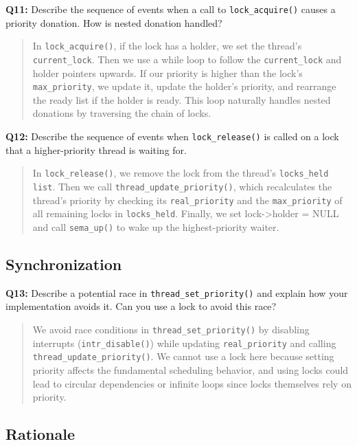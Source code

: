\documentclass[a4paper,11pt]{paper}
\begin{document}
\textbf{Q11:} Describe the sequence of events when a call to
\texttt{lock\_acquire()} causes a priority donation.  How is nested donation
handled?

\begin{quote}
  In \texttt{lock\_acquire()}, if the lock has a holder, we set the thread's \texttt{current\_lock}. Then we use a while loop to follow the \texttt{current\_lock} and holder pointers upwards. If our priority is higher than the lock's \texttt{max\_priority}, we update it, update the holder's priority, and rearrange the ready list if the holder is ready. This loop naturally handles nested donations by traversing the chain of locks.
\end{quote}

\textbf{Q12:} Describe the sequence of events when \texttt{lock\_release()} is
called on a lock that a higher-priority thread is waiting for.

\begin{quote}
  In \texttt{lock\_release()}, we remove the lock from the thread's \texttt{locks\_held list}. Then we call \texttt{thread\_update\_priority()}, which recalculates the thread's priority by checking its \texttt{real\_priority} and the \texttt{max\_priority} of all remaining locks in \texttt{locks\_held}. Finally, we set lock->holder = NULL and call \texttt{sema\_up()} to wake up the highest-priority waiter.
\end{quote}

\subsection{Synchronization}
 
\textbf{Q13:} Describe a potential race in \texttt{thread\_set\_priority()} and
explain how your implementation avoids it. Can you use a lock to avoid this
race?

\begin{quote}
  We avoid race conditions in \texttt{thread\_set\_priority()} by disabling interrupts (\texttt{intr\_disable()}) while updating \texttt{real\_priority} and calling \texttt{thread\_update\_priority()}. We cannot use a lock here because setting priority affects the fundamental scheduling behavior, and using locks could lead to circular dependencies or infinite loops since locks themselves rely on priority.
\end{quote}

\subsection{Rationale}
\end{document}
